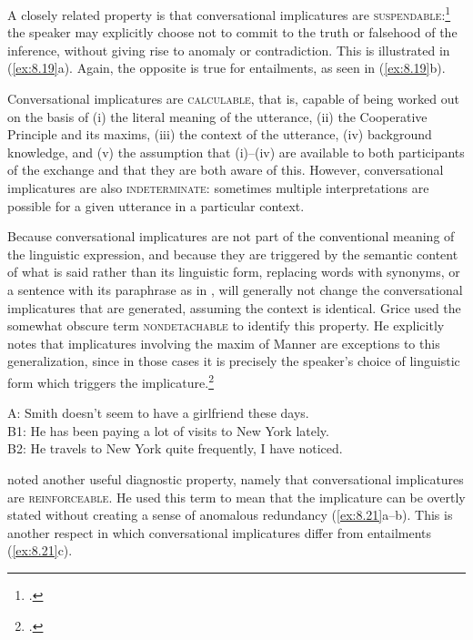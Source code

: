 A closely related property is that conversational implicatures are \textsc{suspendable}:\footnote{\citet{Horn1972,Sadock1978}.} the speaker may explicitly choose not to commit to the truth or falsehood of the inference, without giving rise to anomaly or contradiction. This is illustrated in (\ref{ex:8.19}a). Again, the opposite is true for entailments, as seen in (\ref{ex:8.19}b).


\ea \label{ex:8.19}
                       \z
\z


Conversational implicatures are \textsc{calculable}, that is, capable of being worked out on the basis of (i) the literal meaning of the utterance, (ii) the Cooperative Principle and its maxims, (iii) the context of the utterance, (iv) background knowledge, and (v) the assumption that (i)--(iv) are available to both participants of the exchange and that they are both aware of this. However, conversational implicatures are also \textsc{indeterminate}: sometimes multiple interpretations are possible for a given utterance in a particular context.



Because conversational implicatures are not part of the conventional meaning of the linguistic expression, and because they are triggered by the semantic content of what is said rather than its linguistic form, replacing words with synonyms, or a sentence with its paraphrase as in , will generally not change the conversational implicatures that are generated, assuming the context is identical. Grice used the somewhat obscure term \textsc{nondetachable} to identify this property. He explicitly notes that implicatures involving the maxim of Manner are exceptions to this generalization, since in those cases it is precisely the speaker’s choice of linguistic form which triggers the implicature.\footnote{\citet[58]{Grice1975}.}


\ea \label{ex:8.20}
A: Smith doesn’t seem to have a girlfriend these days.\\
B1: He has been paying a lot of visits to New York lately.\\
B2: He travels to New York quite frequently, I have noticed.
\z


\citet[294]{Sadock1978} noted another useful diagnostic property, namely that conversational implicatures are \textsc{reinforceable}. He used this term to mean that the implicature can be overtly stated without creating a sense of anomalous redundancy (\ref{ex:8.21}a--b). This is another respect in which conversational implicatures differ from entailments (\ref{ex:8.21}c).


